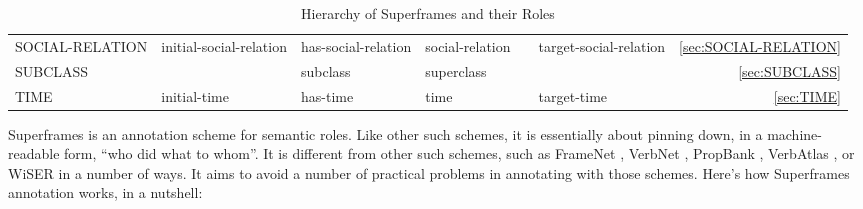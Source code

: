 \documentclass[a4paper]{article}
\newcommand{\fr}[1]{\textsf{#1}}
\newcommand{\rl}[1]{\textsf{#1}}
\newcommand{\Sub}{\textnoto{└} }
\begin{document}
\begin{table}
{\begin{NiceTabular}{llllllr}
            \Sub{} \fr{SOCIAL-RELATION} & \rl{initial-social-relation} & \rl{has-social-relation} & \rl{social-relation} & & \rl{target-social-relation} & \ref{sec:SOCIAL-RELATION} \\

            \Sub{} \fr{SUBCLASS} & & \rl{subclass} & \rl{superclass} & \rl{} & \rl{} & \ref{sec:SUBCLASS} \\

            \Sub{} \fr{TIME} & \rl{initial-time} & \rl{has-time} & \rl{time} & & \rl{target-time} & \ref{sec:TIME} \\

            \bottomrule
        \end{NiceTabular}
    }
    \caption{Hierarchy of Superframes and their Roles}
    \label{tab:superframes}
\end{table}

Superframes is an annotation scheme for semantic roles. Like other such
schemes, it is essentially about pinning down, in a machine-readable form,
``who did what to whom''. It is different from other such schemes, such as
FrameNet \citep{baker-etal-1998-berkeley}, VerbNet
\citep{kipper-schuler-2005-verbnet}, PropBank
\citep{palmer-etal-2005-proposition}, VerbAtlas
\citep{di-fabio-etal-2019-verbatlas}, or WiSER \citep{feng-etal-2022-widely} in
a number of ways. It aims to avoid a number of practical problems in annotating
with those schemes. Here's how Superframes annotation works, in a nutshell:
\end{document}
